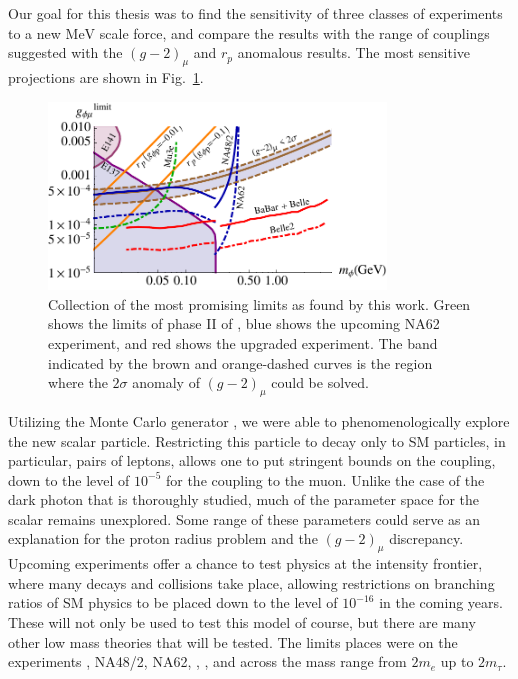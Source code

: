 \label{chapter:conclusion}

Our goal for this thesis was to find the sensitivity of three classes of experiments to a new $\textrm{MeV}$ scale force, and compare the results with the range of couplings suggested with the $(g-2)_\mu$ and $r_p$ anomalous results.
The most sensitive projections are shown in Fig.~\ref{fig:best_limits}.

\begin{figure}[h]
    \centering
    \includegraphics[width=0.8\textwidth]{Figures/limits/best_limits}
    \caption{Collection of the most promising limits as found by this work. Green shows the limits of phase II of \mueee, blue shows the upcoming NA62 experiment, and red shows the upgraded \belletwo experiment. The band indicated by the brown and orange-dashed curves is the region where the $2\sigma$ anomaly of $(g-2)_\mu$ could be solved.} 
    \label{fig:best_limits}
\end{figure}

Utilizing the Monte Carlo generator \madgraph, we were able to phenomenologically explore the new scalar particle.
Restricting this particle to decay only to SM particles, in particular, pairs of leptons, allows one to put stringent bounds on the coupling, down to the level of $10^{-5}$ for the coupling to the muon.
Unlike the case of the dark photon that is thoroughly studied, much of the parameter space for the scalar remains unexplored.
Some range of these parameters could serve as an explanation for the proton radius problem and the $(g-2)_\mu$ discrepancy.
Upcoming experiments offer a chance to test physics at the intensity frontier, where many decays and collisions take place, allowing restrictions on branching ratios of SM physics to be placed down to the level of $10^{-16}$ in the coming years.
These will not only be used to test this model of course, but there are many other low mass theories that will be tested.
The limits places were on the experiments \mueee, NA48/2, NA62, \babar, \belle, and \belletwo across the mass range from $2m_e$ up to $2m_\tau$.

